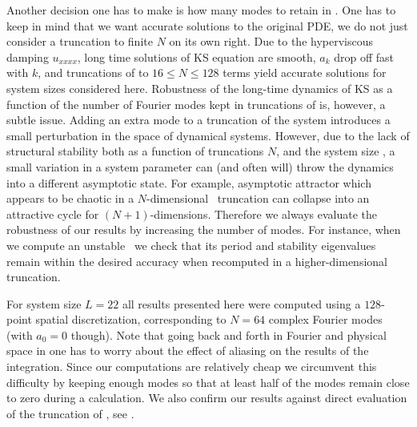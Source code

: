 Another decision one has to make is how many modes to retain
in . One has to keep in mind that we want
accurate solutions to the original PDE, we do not just
consider a truncation to finite $N$ on its own right. Due to
the hyperviscous damping $u_{xxxx}$, long time solutions of
KS equation are smooth, $a_k$ drop off fast with $k$, and
truncations of  to $16 \leq N \leq 128$ terms
yield accurate solutions for system sizes considered here.
Robustness of the long-time dynamics of KS as a function of
the number of Fourier modes kept in truncations of
 is, however, a subtle issue.  Adding an extra
mode to a truncation of the system introduces a small
perturbation in the space of dynamical systems.  However, due
to the lack of structural stability both as a function of
truncations $N$, and the system size \tildeL, a small
variation in a system parameter can (and often will) throw
the dynamics into a different asymptotic state.  For example,
asymptotic attractor which appears to be chaotic in a
$N$-dimensional \statesp\ truncation can collapse into an
attractive cycle for $(N\!+\!1)$-dimensions. Therefore we
always evaluate the robustness of our results by increasing
the number of modes. For instance, when we compute an
unstable \po\ we check that its period and stability
eigenvalues remain within the desired accuracy when
recomputed in a higher-dimensional truncation.

For system size $L=22$ all results presented here were computed using
a $128$-point spatial discretization, corresponding to $N=64$ complex Fourier modes
(with $a_0=0$ though). Note that going back and forth in Fourier and physical
space in  one has to worry about the effect of aliasing
on the results of the integration. Since our computations are relatively cheap
we circumvent this difficulty by keeping enough modes so that at least half
of the modes remain close to zero during a calculation. We also confirm our
results against direct evaluation of the truncation of , see .



%

